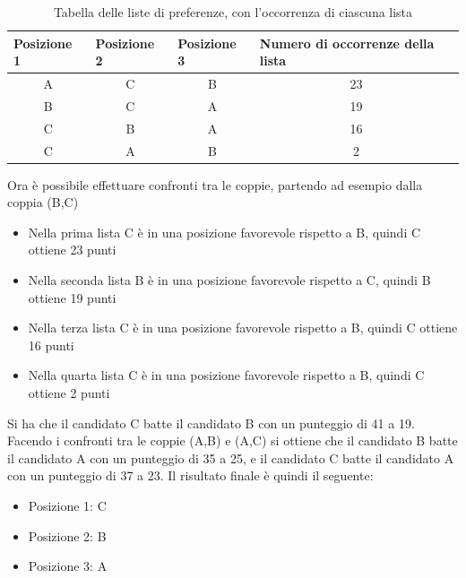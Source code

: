 \documentclass[12pt,a4paper,openright,twoside]{book}
\begin{document}
\renewcommand{\arraystretch}{1.5}
\begin{table}[H]
    \centering
    \begin{tabular}{|c|c|c|c|}
    \hline
    \multicolumn{1}{|l|}{Posizione 1} & \multicolumn{1}{|l|}{Posizione 2} & \multicolumn{1}{|l|}{Posizione 3} & \multicolumn{1}{l|}{Numero di occorrenze della lista } \\ \hline
    A & C & B & 23                              \\ \hline
    B & C & A & 19                              \\ \hline
    C & B & A & 16                              \\ \hline
    C & A & B & 2                               \\ \hline
    \end{tabular}
    \caption{Tabella delle liste di preferenze, con l'occorrenza di ciascuna lista}
    \label{table:voticondorcet}
\end{table}

Ora è possibile effettuare confronti tra le coppie, partendo ad esempio dalla coppia (B,C)
\begin{itemize}
    \item{Nella prima lista C è in una posizione favorevole rispetto a B, quindi C ottiene 23 punti}
    \item{Nella seconda lista B è in una posizione favorevole rispetto a C, quindi B ottiene 19 punti}
    \item{Nella terza lista C è in una posizione favorevole rispetto a B, quindi C ottiene 16 punti}
    \item{Nella quarta lista C è in una posizione favorevole rispetto a B, quindi C ottiene 2 punti}
\end{itemize}

Si ha che il candidato C batte il candidato B con un punteggio di 41 a 19.
Facendo i confronti tra le coppie (A,B) e (A,C) si ottiene che il candidato
B batte il candidato A con un punteggio di 35 a 25, e il candidato C batte il candidato
A con un punteggio di 37 a 23. Il risultato finale è quindi il seguente:
\begin{itemize}
    \item{Posizione 1: C}
    \item{Posizione 2: B}
    \item{Posizione 3: A}
\end{itemize} 
\end{document}
